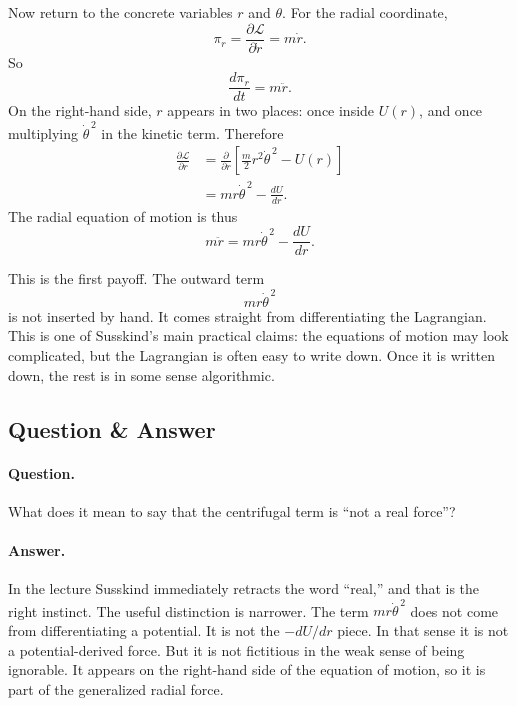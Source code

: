 Now return to the concrete variables \(r\) and \(\theta\). For the radial coordinate,
\begin{equation}
\pi_r=\frac{\partial \mathcal{L}}{\partial \dot r}=m\dot r.
\end{equation}
So
\begin{equation}
\frac{d\pi_r}{dt}=m\ddot r.
\end{equation}
On the right-hand side, \(r\) appears in two places: once inside \(U(r)\), and once multiplying \(\dot\theta^{\,2}\) in the kinetic term. Therefore
\begin{align}
\frac{\partial \mathcal{L}}{\partial r}
&=
\frac{\partial}{\partial r}
\left[
\frac{m}{2}r^2\dot\theta^{\,2}-U(r)
\right] \\
&=
mr\dot\theta^{\,2}-\frac{dU}{dr}.
\end{align}
The radial equation of motion is thus
\begin{equation}
m\ddot r=mr\dot\theta^{\,2}-\frac{dU}{dr}.
\end{equation}

This is the first payoff. The outward term
\begin{equation}
mr\dot\theta^{\,2}
\end{equation}
is not inserted by hand. It comes straight from differentiating the Lagrangian. This is one of Susskind's main practical claims: the equations of motion may look complicated, but the Lagrangian is often easy to write down. Once it is written down, the rest is in some sense algorithmic.

\subsection{Question \& Answer}

\paragraph{Question.} What does it mean to say that the centrifugal term is ``not a real force''?

\paragraph{Answer.} In the lecture Susskind immediately retracts the word ``real,'' and that is the right instinct. The useful distinction is narrower. The term \(mr\dot\theta^{\,2}\) does not come from differentiating a potential. It is not the \(-dU/dr\) piece. In that sense it is not a potential-derived force. But it is not fictitious in the weak sense of being ignorable. It appears on the right-hand side of the equation of motion, so it is part of the generalized radial force.

